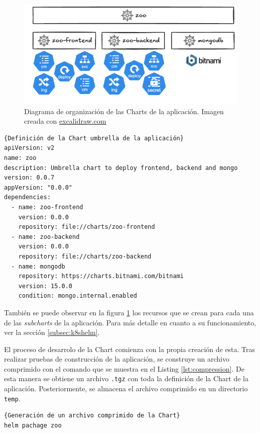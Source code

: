 \begin{figure}
  \centerline{\includegraphics[width=13cm]{figuras/helm-repository}}
  \caption{Diagrama de organización de las Charts de la aplicación. Imagen creada con \href{https://excalidraw.com}{excalidraw.com}}
  \label{fig:helm-repository}
\end{figure}

\begin{lstlisting}[language=helm,label=lst:umbrella]{Definición de la Chart umbrella de la aplicación}
apiVersion: v2
name: zoo
description: Umbrella chart to deploy frontend, backend and mongo
version: 0.0.7
appVersion: "0.0.0"
dependencies:
  - name: zoo-frontend
    version: 0.0.0
    repository: file://charts/zoo-frontend
  - name: zoo-backend
    version: 0.0.0
    repository: file://charts/zoo-backend
  - name: mongodb
    repository: https://charts.bitnami.com/bitnami
    version: 15.0.0
    condition: mongo.internal.enabled
\end{lstlisting}

También se puede observar en la figura \ref{fig:helm-repository} los recursos que se crean para cada una de las \textit{subcharts} de la aplicación. Para más detalle en cuanto a su funcionamiento, ver la sección \ref{subsec:k8shelm}.

El proceso de desarrolo de la Chart comienza con la propia creación de esta. Tras realizar pruebas de construcción de la aplicación, se construye un archivo comprimido con el comando que se muestra en el Listing \ref{lst:compression}. De esta manera se obtiene un archivo \texttt{.tgz} con toda la definición de la Chart de la aplicación. Posteriormente, se almacena el archivo comprimido en un directorio \texttt{temp}.

\begin{lstlisting}[language=bash,label=lst:compression]{Generación de un archivo comprimido de la Chart}
helm pachage zoo
\end{lstlisting}

